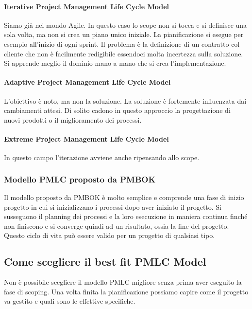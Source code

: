 \paragraph{Iterative Project Management Life Cycle Model}
Siamo già nel mondo Agile. In questo caso lo scope non si tocca e si definisce una sola volta, ma non si crea un piano unico iniziale. La pianificazione si esegue per esempio all'inizio di ogni sprint. Il problema è la definizione di un contratto col cliente che non è facilmente redigibile essendoci molta incertezza sulla soluzione. Si apprende meglio il dominio mano a mano che si crea l'implementazione.
\paragraph{Adaptive Project Management Life Cycle Model}
L'obiettivo è noto, ma non la soluzione. La soluzione è fortemente influenzata dai cambiamenti attesi. Di solito cadono in questo approccio la progettazione di nuovi prodotti o il miglioramento dei processi.
\paragraph{Extreme Project Management Life Cycle Model}
In questo campo l'iterazione avviene anche ripensando allo scope.
\subsubsection{Modello PMLC proposto da PMBOK}
Il modello proposto da PMBOK è molto semplice e comprende una fase di inizio progetto in cui si inizializzano i processi dopo aver iniziato il progetto. Si susseguono il planning dei processi e la loro esecuzione in maniera continua finché non finiscono e si converge quindi ad un risultato, ossia la fine del progetto. Questo ciclo di vita può essere valido per un progetto di qualsiasi tipo.
\subsection{Come scegliere il best fit PMLC Model}
Non è possibile scegliere il modello PMLC migliore senza prima aver eseguito la fase di scoping. Una volta finita la pianificazione possiamo capire come il progetto va gestito e quali sono le effettive specifiche.

